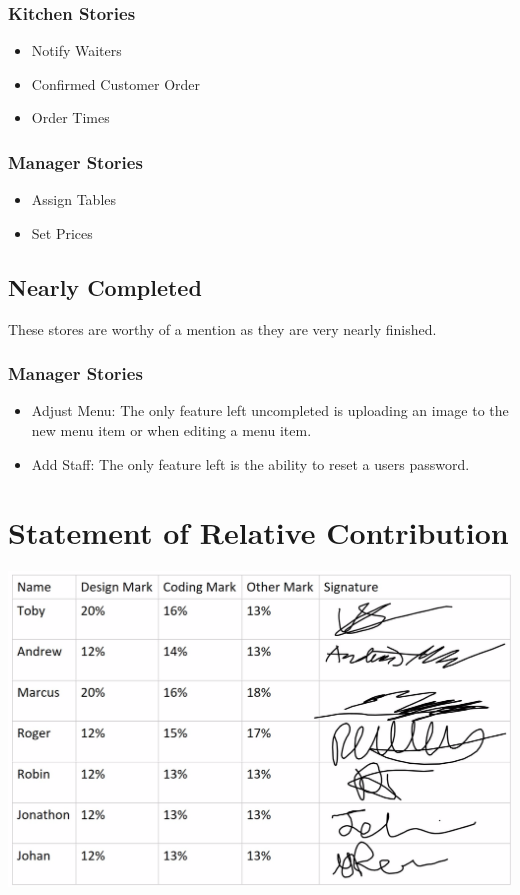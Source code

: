 \documentclass[12pt, twoside, a4paper]{report}
\begin{document}
\subsection*{Kitchen Stories}
\begin{itemize}
  \item Notify Waiters
  \item Confirmed Customer Order
  \item Order Times
\end{itemize}

\subsection*{Manager Stories}
\begin{itemize}
  \item Assign Tables
  \item Set Prices
\end{itemize}

\section*{Nearly Completed}
These stores are worthy of a mention as they are very nearly finished.

\subsection*{Manager Stories}
\begin{itemize}
  \item Adjust Menu:
    The only feature left uncompleted is uploading an image to the new menu item or when editing a menu item.
  \item Add Staff:
    The only feature left is the ability to reset a users password.
\end{itemize}

\chapter*{Statement of Relative Contribution}
\includegraphics[width=15cm]{StateOfCont.png}
\end{document}

